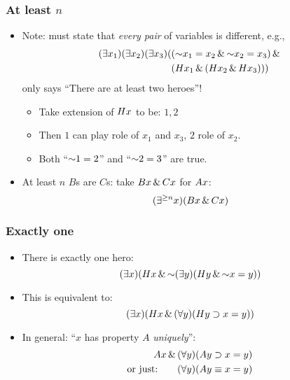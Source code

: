 \begin{frame}
  \frametitle{At least $n$}

\begin{itemize}[<+->]
\item Note: must state that \emph{every pair} of variables is different, e.g.,
\begin{align*}
\qt{\exists}{x_1}\qt{\exists}{x_2}\qt{\exists}{x_3}(&(\enot x_1 = x_2 \land \enot x_2 = x_3) \land {}\\
& (H\qv{x_1} \land (H\qv{x_2} \land H\qv{x_3})))
\end{align*}
only says ``There are at least two heroes''!
\begin{itemize}[<+->]
  \item Take extension of $Hx$ to be: $1,2$
  \item Then $1$ can play role of $x_1$ and $x_3$, $2$ role of $x_2$.
  \item Both ``$\enot 1=2$'' and ``$\enot 2=3$'' are true.
\end{itemize}
\item At least $n$ $B$s are $C$s: take $Bx \,\&\, Cx$ for $Ax$:
\[
(\exists^{\ge n} x) (Bx \,\&\, Cx)
\]
\end{itemize}
\end{frame}

\begin{frame}
    \frametitle{Exactly one}

\begin{itemize}[<+->]
\item There is exactly one hero:
\[
\qt{\exists}{x}(H\qv{x} \land \lnot \qt{\exists}{y}(H\qv{y} \land \enot x = y))
\]
\item This is equivalent to:
\[
(\exists x)(Hx \,\&\, (\forall y)(Hy \supset x = y))
\]
\item In general: ``$x$ has property $A$ \emph{uniquely}'':
\begin{align*}
Ax \,\&\, {} & (\forall y)(Ay \supset x = y)\\
\text{or just:\qquad} & (\forall y)(Ay \equiv x = y)
\end{align*}
\end{itemize}
\end{frame}

